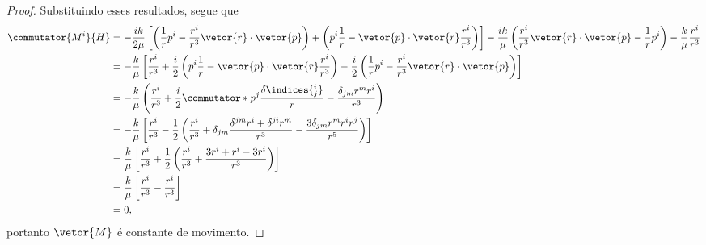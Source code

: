 \begin{proof}
   Substituindo esses resultados, segue que
   \begin{align*}
      \commutator{M^i}{H} &= -\frac{ik}{2\mu} \left[\left(\frac{1}{r}p^i - \frac{r^i}{r^3} \vetor{r} \cdot \vetor{p}\right) + \left(p^i\frac{1}{r} - \vetor{p} \cdot \vetor{r} \frac{r^i}{r^3}\right)\right] - \frac{ik}{\mu} \left(\frac{r^i}{r^3} \vetor{r}\cdot\vetor{p} - \frac{1}{r} p^i\right) - \frac{k}{\mu}\frac{r^i}{r^3}\\
                          &= -\frac{k}{\mu}\left[\frac{r^i}{r^3} + \frac{i}2\left(p^i \frac{1}{r} - \vetor{p} \cdot \vetor{r} \frac{r^i}{r^3}\right) - \frac{i}2\left(\frac{1}{r}p^i -  \frac{r^i}{r^3}\vetor{r} \cdot \vetor{p}\right)\right]\\
                          &= -\frac{k}{\mu} \left(\frac{r^i}{r^3} + \frac{i}2 \commutator*{p^j}{\frac{\delta\indices{^i_j}}{r} - \frac{\delta_{jm} r^m r^i}{r^3}}\right)\\
                          &= - \frac{k}{\mu} \left[\frac{r^i}{r^3} - \frac{1}2\left(\frac{r^i}{r^3} + \delta_{jm}\frac{\delta^{jm}r^i + \delta^{ji}r^m}{r^3} - \frac{3\delta_{jm}r^m r^i r^j}{r^5}\right)\right]\\
                          &= \frac{k}{\mu} \left[\frac{r^i}{r^3} + \frac12\left(\frac{r^i}{r^3} + \frac{3r^i + r^i - 3r^i}{r^3}\right)\right]\\
                          &= \frac{k}{\mu} \left[\frac{r^i}{r^3} - \frac{r^i}{r^3}\right]\\
                          &= 0,
   \end{align*}
   portanto \(\vetor{M}\) é constante de movimento.


\end{proof}

